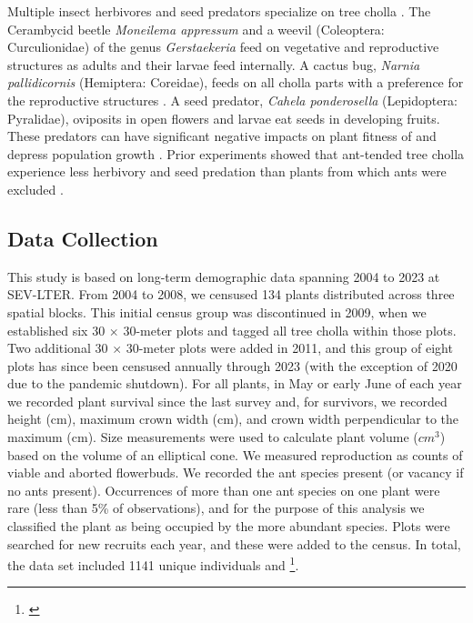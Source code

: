 \documentclass[11pt]{article}
\newcommand{\tom}[2]{{\color{red}{#1}}\footnote{\textit{\color{red}{#2}}}}
\begin{document}
Multiple insect herbivores and seed predators specialize on tree cholla \citep{Mann1969}. 
The Cerambycid beetle \textit{Moneilema appressum} and a weevil (Coleoptera: Curculionidae) of the genus \textit{Gerstaekeria} feed on vegetative and reproductive structures as adults and their larvae feed internally. 
A cactus bug, \textit{Narnia pallidicornis} (Hemiptera: Coreidae), feeds on all cholla parts with a preference for the reproductive structures \citep{Miller2006}.
A seed predator, \textit{Cahela ponderosella} (Lepidoptera: Pyralidae), oviposits in open flowers and larvae eat seeds in developing fruits. 
These predators can have significant negative impacts on plant fitness of and depress population growth \citep{Miller2009}.
Prior experiments showed that ant-tended tree cholla experience less herbivory and seed predation than plants from which ants were excluded \citep{Miller2007,Ohm2014}. 

\subsection*{Data Collection}
This study is based on long-term demographic data spanning 2004 to 2023 at SEV-LTER. 
From 2004 to 2008, we censused 134 plants distributed across three spatial blocks. 
This initial census group was discontinued in 2009, when we established six 30 $\times$ 30-meter plots and tagged all tree cholla within those plots. 
Two additional 30 $\times$ 30-meter plots were added in 2011, and this group of eight plots has since been censused annually through 2023 (with the exception of 2020 due to the pandemic shutdown). 
For all plants, in May or early June of each year we recorded plant survival since the last survey and, for survivors, we recorded height (cm), maximum crown width (cm), and crown width perpendicular to the maximum (cm).
Size measurements were used to calculate plant volume ($cm^3$) based on the volume of an elliptical cone. 
We measured reproduction as counts of viable and aborted flowerbuds. 
We recorded the ant species present (or vacancy if no ants present).
Occurrences of more than one ant species on one plant were rare (less than 5\% of observations), and for the purpose of this analysis we classified the plant as being occupied by the more abundant species. 
Plots were searched for new recruits each year, and these were added to the census.
In total, the data set included 1141 unique individuals and \tom{19 plant-year observations}{It is 19 years but the number of plant-year observations should be the total number of rows in the data set}. 
\end{document}
